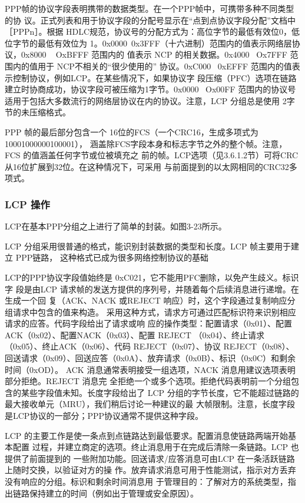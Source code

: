 PPP帧的协议字段表明携带的数据类型。在一个PPP帧中，可携带多种不同类型的协
议。正式列表和用于协议字段的分配号显示在“点到点协议字段分配”文档中［PPPn］。根据
HDLC规范，协议号的分配方式为：高位字节的最低有效位0，低位字节的最低有效位为
1。0x0000~0x3FFF（十六进制）范围内的值表示网络层协议，0x8000 ~ OxBFFF 范围内的
值表示 NCP 的相关数据。0x4000~ Ox7FFF 范围内的值用于 NCP不相关的“很少使用的”
协议。0xC000~ 0xEFFF 范围内的值表示控制协议，例如LCP。在某些情况下，如果协议字
段压缩（PFC）选项在链路建立时协商成功，协议字段可被压缩为1字节。0x0000~ Ox00FF
范围内的协议号适用于包括大多数流行的网络层协议在内的协议。注意，LCP 分组总是使用
2字节的未压缩格式。

PPP 帧的最后部分包含一个 16位的FCS（一个CRC16，生成多项式为10001000000100001），
涵盖除FCS字段本身和标志字节之外的整个帧。注意，FCS 的值涵盖任何字节或位被填充之
前的帧。LCP选项（见3.6.1.2节）可将CRC从16位扩展到32位。在这种情况下，可采用
与前面提到的以太网相同的CRC32多项式。

\subsubsection{LCP 操作}

LCP在基本PPP分组之上进行了简单的封装。如图3-23所示。

LCP 分组采用很普通的格式，能识别封装数据的类型和长度。LCP 帧主要用于建立 PPP链路，
这种格式已成为很多网络控制协议的基础

LCP的PPP协议字段值始终是 0xC021，它不能用PFC删除，以免产生歧义。标识字
段是由LCP 请求帧的发送方提供的序列号，并随着每个后续消息进行递增。在生成一个回
复（ACK、NACK 或REJECT 响应）时，这个字段通过复制响应分组请求中包含的值来构造。
采用这种方式，请求方可通过匹配标识符来识别相应请求的应答。代码字段给出了请求或响
应的操作类型：配置请求（0x01）、配置ACK（0x02）、配置NACK（0x03）、配置 REJECT
（0x04）、终止请求（0x05）、终止ACK（0x06）、代码 REJECT（0x07）、协议 REJECT（0x08）、
回送请求（0x09）、回送应答（0x0A）、放弃请求（0x0B）、标识（0x0C）和剩余时间（0xOD）。
ACK 消息通常表明接受一组选项，NACK 消息用建议选项表明部分拒绝。REJECT 消息完
全拒绝一个或多个选项。拒绝代码表明前一个分组包含的某些字段值未知。长度字段给出了
LCP 分组的字节长度，它不能超过链路的最大接收单元（MRU），我们稍后讨论一种建议的最
大帧限制。注意，长度字段是LCP协议的一部分；PPP协议通常不提供这种字段。

LCP 的主要工作是使一条点到点链路达到最低要求。配置消息使链路两端开始基本配置
过程，并建立商定的选项。终止消息用于在完成后清除一条链路。LCP 也提供了前面提到的
一些附加功能。回送请求/应答消息可由LCP 在一条活跃链路上随时交换，以验证对方的操
作。放弃请求消息可用于性能测试，指示对方丢弃没有响应的分组。标识和剩余时间消息用
于管理目的：了解对方的系统类型，指出链路保持建立的时间（例如出于管理或安全原因）。

